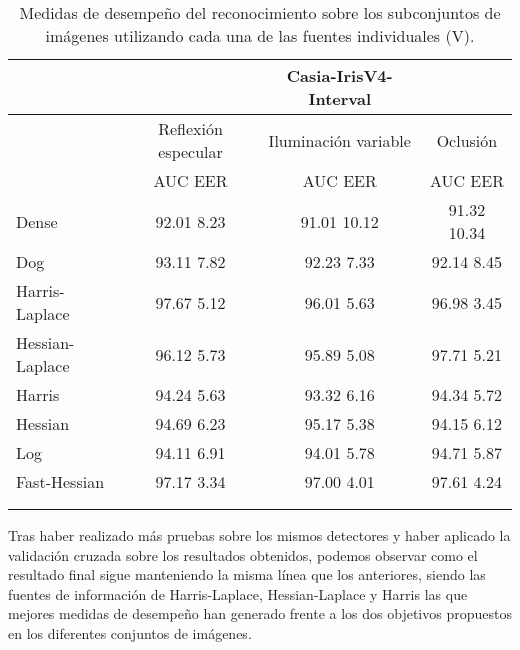 \begin{table}[h]
\begin{center}
\begin{tabular}{@{}lccc@{}}
\toprule
&& Casia-IrisV4-Interval & \\ \hline
&Reflexión especular		&  	Iluminación variable		& Oclusión \\ \hline
&AUC  \phantom{aa} EER  &  	AUC  \phantom{aa} EER 	& AUC  \phantom{aa} EER  \\ \hline
Dense& 92.01 \phantom{aa} 8.23   &  	91.01 \phantom{aa} 10.12  & 91.32 \phantom{aa} 10.34  \\
Dog& 93.11 \phantom{aa} 7.82   &  	92.23 \phantom{aa} 7.33  & 92.14 \phantom{aa} 8.45  \\
Harris-Laplace& 97.67 \phantom{aa} 5.12   &  	96.01 \phantom{aa} 5.63  & 96.98 \phantom{aa} 3.45  \\
Hessian-Laplace& 96.12 \phantom{aa} 5.73   &  95.89 \phantom{aa} 5.08 & 97.71 \phantom{aa} 5.21  \\
Harris& 94.24  \phantom{aa}5.63  &  	93.32 \phantom{aa} 6.16  & 94.34  \phantom{aa}5.72  \\
Hessian& 94.69 \phantom{aa} 6.23   &  95.17 \phantom{aa} 5.38  & 94.15 \phantom{aa} 6.12  \\
Log& 94.11 \phantom{aa} 6.91  &  94.01  \phantom{aa}5.78 & 94.71 \phantom{aa} 5.87   \\ 
Fast-Hessian& 97.17 \phantom{aa} 3.34   &  	97.00 \phantom{aa} 4.01  & 97.61 \phantom{aa} 4.24  \\  \\  \\

\end{tabular}
\end{center}
\caption{Medidas de desempeño del reconocimiento sobre los subconjuntos de imágenes utilizando cada una de las fuentes individuales (V).}
\label{my_tabla}
\end{table}

\newpage

Tras haber realizado más pruebas sobre los mismos detectores y haber aplicado la validación cruzada sobre los resultados obtenidos, podemos observar como el resultado final sigue manteniendo la misma línea que los anteriores, siendo las fuentes de información de Harris-Laplace, Hessian-Laplace y Harris las que mejores medidas de desempeño han generado frente a los dos objetivos propuestos en los diferentes conjuntos de imágenes. \\

